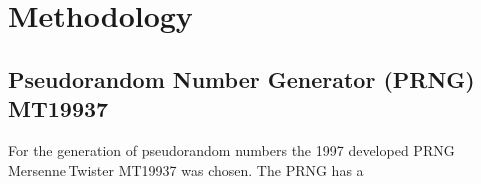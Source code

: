\section{Methodology}

\subsection{Pseudorandom Number Generator (PRNG) MT19937}\label{ssec:methodology_rng_mt19937}

For the generation of pseudorandom numbers the 1997 developed PRNG Mer\-sen\-ne\,Twis\-ter MT19937\cite{Makoto_Takuji} was chosen.\cite{educativeMersenneTwister} The PRNG has a
